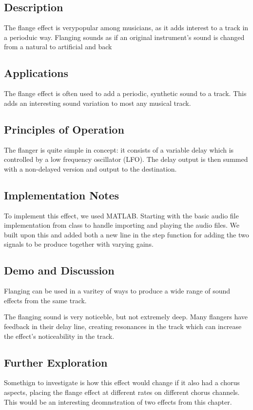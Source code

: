 \subsection{Description}
The flange effect is verypopular among musicians, as it adds interest to a track in a perioduic way. Flanging sounds as if an original instrument's sound is changed from a natural to artificial and back 

\subsection{Applications}
The flange effect is often used to add a periodic, synthetic sound to a track. This adds an interesting sound variation to most any musical track.

\subsection{Principles of Operation}
The flanger is quite simple in concept: it consists of a variable delay which is controlled by a low frequency oscillator (LFO). The delay output is then summed with a non-delayed version and output to the destination.

\subsection{Implementation Notes}
To implement this effect, we used MATLAB. Starting with the basic audio file implementation from class to handle importing and playing the audio files. We built upon this and added both a new line in the step function for adding the two signals to be produce together with varying gains. 

\subsection{Demo and Discussion}
Flanging can be used in a varitey of ways to produce a wide range of sound effects from the same track.


The flanging sound is very noticeble, but not extremely deep. Many flangers have feedback in their delay line, creating resonances in the track which can increase the effect's noticeability in the track. 


\subsection{Further Exploration}
Somethign to investigate is how this effect would change if it also had a chorus aspects, placing the flange effect at different rates on different chorus channels. This would be an interesting deomnstration of two effects from this chapter.
